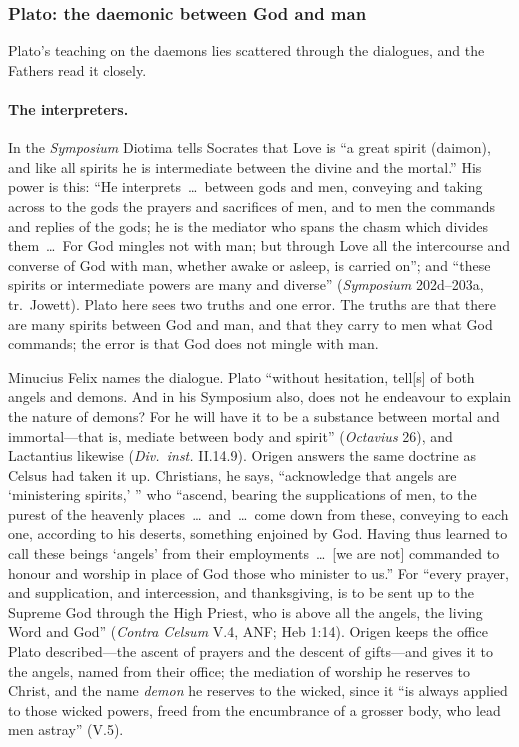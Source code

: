 \subsubsection{Plato: the daemonic between God and man}\label{sec:bc-plato}

Plato's teaching on the daemons lies scattered through the dialogues,
and the Fathers read it closely.

\paragraph{The interpreters.} In the \emph{Symposium} Diotima tells
Socrates that Love is ``a great spirit (daimon), and like all spirits he
is intermediate between the divine and the mortal.'' His power is this:
``He interprets~\dots\ between gods and men, conveying and taking across
to the gods the prayers and sacrifices of men, and to men the commands
and replies of the gods; he is the mediator who spans the chasm which
divides them~\dots\ For God mingles not with man; but through Love all the intercourse and
converse of God with man, whether awake or asleep, is carried on''; and
``these spirits or intermediate powers are many and diverse''
(\emph{Symposium} 202d--203a, tr.\ Jowett). Plato here sees two truths
and one error. The truths are that there are many spirits between God
and man, and that they carry to men what God commands; the error is that
God does not mingle with man.

Minucius Felix names the dialogue. Plato ``without hesitation, tell[s]
of both angels and demons. And in his Symposium also, does not he
endeavour to explain the nature of demons? For he will have it to be a
substance between mortal and immortal---that is, mediate between body
and spirit'' (\emph{Octavius} 26), and Lactantius likewise
(\emph{Div.\ inst.} II.14.9). Origen answers the same doctrine as Celsus had taken it
up. Christians, he says, ``acknowledge that angels are `ministering
spirits,' '' who ``ascend, bearing the supplications of men, to the
purest of the heavenly places~\dots\ and~\dots\ come down from these,
conveying to each one, according to his deserts, something enjoined by
God. Having thus learned to call these beings `angels' from
their employments~\dots\ [we are not] commanded to honour and worship in
place of God those who minister to us.'' For ``every prayer, and supplication, and intercession, and
thanksgiving, is to be sent up to the Supreme God through the High
Priest, who is above all the angels, the living Word and God''
(\emph{Contra Celsum} V.4, ANF; Heb 1:14). Origen keeps the office Plato
described---the ascent of prayers and the descent of gifts---and gives
it to the angels, named from their office; the mediation of worship he
reserves to Christ, and the name \emph{demon} he reserves to the wicked,
since it ``is always applied to those wicked powers, freed from the
encumbrance of a grosser body, who lead men astray'' (V.5).

